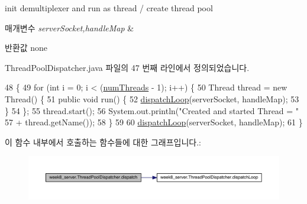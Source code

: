 init demultiplexer and run as thread / create thread pool 
\begin{DoxyParams}{매개변수}
{\em server\-Socket,handle\-Map} & \\
\hline
\end{DoxyParams}
\begin{DoxyReturn}{반환값}
none 
\end{DoxyReturn}


Thread\-Pool\-Dispatcher.\-java 파일의 47 번째 라인에서 정의되었습니다.


\begin{DoxyCode}
48                                        \{
49         \textcolor{keywordflow}{for} (\textcolor{keywordtype}{int} i = 0; i < (\hyperlink{classweek8__server_1_1_thread_pool_dispatcher_af2930528df7e19e996420a857079ea69}{numThreads} - 1); i++) \{
50             Thread thread = \textcolor{keyword}{new} Thread() \{
51                 \textcolor{keyword}{public} \textcolor{keywordtype}{void} run() \{
52                     \hyperlink{classweek8__server_1_1_thread_pool_dispatcher_a7138d250700b8e7c5840ebfe11da0e83}{dispatchLoop}(serverSocket, handleMap);
53                 \}
54             \};
55             thread.start();
56             System.out.println(\textcolor{stringliteral}{"Created and started Thread = "}
57                     + thread.getName());
58         \}
59 
60         \hyperlink{classweek8__server_1_1_thread_pool_dispatcher_a7138d250700b8e7c5840ebfe11da0e83}{dispatchLoop}(serverSocket, handleMap);
61     \}
\end{DoxyCode}


이 함수 내부에서 호출하는 함수들에 대한 그래프입니다.\-:
\nopagebreak
\begin{figure}[H]
\begin{center}
\leavevmode
\includegraphics[width=350pt]{classweek8__server_1_1_thread_pool_dispatcher_a44247cc26ed377303c2e86e00863cf6a_cgraph}
\end{center}
\end{figure}


